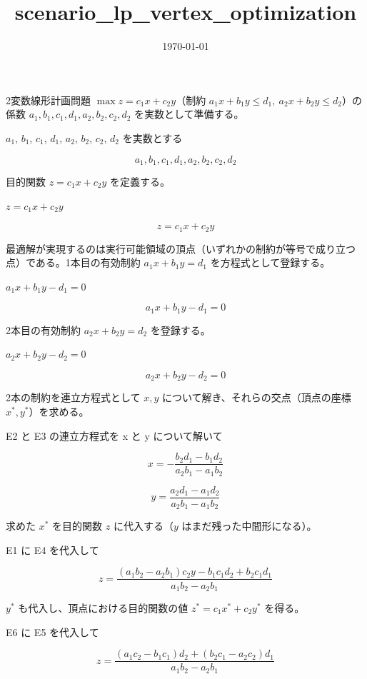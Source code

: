 \documentclass[dvipdfmx,a4paper,11pt]{jsarticle}
\title{scenario\_lp\_vertex\_optimization}
\date{\today}
\begin{document}
\maketitle

2変数線形計画問題 $\max z=c_1x+c_2y$（制約 $a_1x+b_1y\le d_1,\ a_2x+b_2y\le d_2$）の係数 $a_1,b_1,c_1,d_1,a_2,b_2,c_2,d_2$ を実数として準備する。

$a_1$, $b_1$, $c_1$, $d_1$, $a_2$, $b_2$, $c_2$, $d_2$ を実数とする

\[
  a_1, b_1, c_1, d_1, a_2, b_2, c_2, d_2
\]

目的関数 $z=c_1x+c_2y$ を定義する。

$z = c_1 x + c_2 y$

\begin{equation}
  z = c_1 x + c_2 y
  \label{eq:E1}
\end{equation}

最適解が実現するのは実行可能領域の頂点（いずれかの制約が等号で成り立つ点）である。1本目の有効制約 $a_1x+b_1y=d_1$ を方程式として登録する。

$a_1 x + b_1 y - d_1 = 0$

\begin{equation}
  a_1 x + b_1 y - d_1 = 0
  \label{eq:E2}
\end{equation}

2本目の有効制約 $a_2x+b_2y=d_2$ を登録する。

$a_2 x + b_2 y - d_2 = 0$

\begin{equation}
  a_2 x + b_2 y - d_2 = 0
  \label{eq:E3}
\end{equation}

2本の制約を連立方程式として $x,y$ について解き、それらの交点（頂点の座標 $x^*,y^*$）を求める。

E2 と E3 の連立方程式を x と y について解いて

\begin{equation}
  x = -\frac{b_{2} d_{1}-b_{1} d_{2}}{a_{2} b_{1}-a_{1} b_{2}}
  \label{eq:E4}
\end{equation}

\begin{equation}
  y = \frac{a_{2} d_{1}-a_{1} d_{2}}{a_{2} b_{1}-a_{1} b_{2}}
  \label{eq:E5}
\end{equation}

求めた $x^*$ を目的関数 $z$ に代入する（$y$ はまだ残った中間形になる）。

E1 に E4 を代入して

\begin{equation}
  z = \frac{\left(a_{1} b_{2}-a_{2} b_{1}\right) c_{2} y-b_{1} c_{1} d_{2}+b_{2} c_{1} d_{1}}{a_{1} b_{2}-a_{2} b_{1}}
  \label{eq:E6}
\end{equation}

$y^*$ も代入し、頂点における目的関数の値 $z^*=c_1x^*+c_2y^*$ を得る。

E6 に E5 を代入して

\begin{equation}
  z = \frac{\left(a_{1} c_{2}-b_{1} c_{1}\right) d_{2}+\left(b_{2} c_{1}-a_{2} c_{2}\right) d_{1}}{a_{1} b_{2}-a_{2} b_{1}}
  \label{eq:E7}
\end{equation}
\end{document}
